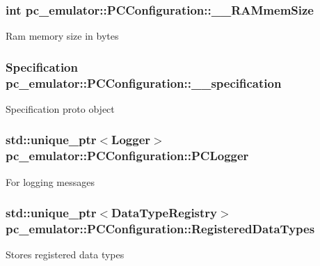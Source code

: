 \subsubsection[{\texorpdfstring{\+\_\+\+\_\+\+R\+A\+Mmem\+Size}{__RAMmemSize}}]{\setlength{\rightskip}{0pt plus 5cm}int pc\+\_\+emulator\+::\+P\+C\+Configuration\+::\+\_\+\+\_\+\+R\+A\+Mmem\+Size}\hypertarget{classpc__emulator_1_1PCConfiguration_a266b289b9d885f81f4434eff87bfde9c}{}\label{classpc__emulator_1_1PCConfiguration_a266b289b9d885f81f4434eff87bfde9c}
Ram memory size in bytes 
\subsubsection[{\texorpdfstring{\+\_\+\+\_\+specification}{__specification}}]{\setlength{\rightskip}{0pt plus 5cm}Specification pc\+\_\+emulator\+::\+P\+C\+Configuration\+::\+\_\+\+\_\+specification}\hypertarget{classpc__emulator_1_1PCConfiguration_afb61c199d022bb347e22628d27d8b3e7}{}\label{classpc__emulator_1_1PCConfiguration_afb61c199d022bb347e22628d27d8b3e7}
Specification proto object 
\subsubsection[{\texorpdfstring{P\+C\+Logger}{PCLogger}}]{\setlength{\rightskip}{0pt plus 5cm}std\+::unique\+\_\+ptr$<${\bf Logger}$>$ pc\+\_\+emulator\+::\+P\+C\+Configuration\+::\+P\+C\+Logger}\hypertarget{classpc__emulator_1_1PCConfiguration_ab74d020cc35875ac3092a4db604ad322}{}\label{classpc__emulator_1_1PCConfiguration_ab74d020cc35875ac3092a4db604ad322}
For logging messages 
\subsubsection[{\texorpdfstring{Registered\+Data\+Types}{RegisteredDataTypes}}]{\setlength{\rightskip}{0pt plus 5cm}std\+::unique\+\_\+ptr$<${\bf Data\+Type\+Registry}$>$ pc\+\_\+emulator\+::\+P\+C\+Configuration\+::\+Registered\+Data\+Types}\hypertarget{classpc__emulator_1_1PCConfiguration_a1021cb61a4911ed3b0043bc87657b6e5}{}\label{classpc__emulator_1_1PCConfiguration_a1021cb61a4911ed3b0043bc87657b6e5}
Stores registered data types 

